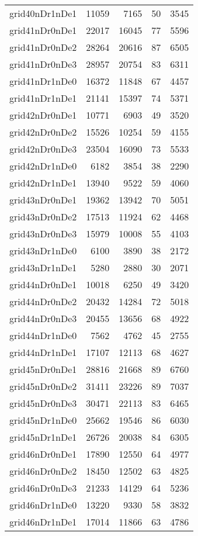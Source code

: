 \begin{tabular}{lrrrr}
grid40nDr1nDe1 & 11059 & 7165 & 50 & 3545 \\
grid41nDr0nDe1 & 22017 & 16045 & 77 & 5596 \\
grid41nDr0nDe2 & 28264 & 20616 & 87 & 6505 \\
grid41nDr0nDe3 & 28957 & 20754 & 83 & 6311 \\
grid41nDr1nDe0 & 16372 & 11848 & 67 & 4457 \\
grid41nDr1nDe1 & 21141 & 15397 & 74 & 5371 \\
grid42nDr0nDe1 & 10771 & 6903 & 49 & 3520 \\
grid42nDr0nDe2 & 15526 & 10254 & 59 & 4155 \\
grid42nDr0nDe3 & 23504 & 16090 & 73 & 5533 \\
grid42nDr1nDe0 & 6182 & 3854 & 38 & 2290 \\
grid42nDr1nDe1 & 13940 & 9522 & 59 & 4060 \\
grid43nDr0nDe1 & 19362 & 13942 & 70 & 5051 \\
grid43nDr0nDe2 & 17513 & 11924 & 62 & 4468 \\
grid43nDr0nDe3 & 15979 & 10008 & 55 & 4103 \\
grid43nDr1nDe0 & 6100 & 3890 & 38 & 2172 \\
grid43nDr1nDe1 & 5280 & 2880 & 30 & 2071 \\
grid44nDr0nDe1 & 10018 & 6250 & 49 & 3420 \\
grid44nDr0nDe2 & 20432 & 14284 & 72 & 5018 \\
grid44nDr0nDe3 & 20455 & 13656 & 68 & 4922 \\
grid44nDr1nDe0 & 7562 & 4762 & 45 & 2755 \\
grid44nDr1nDe1 & 17107 & 12113 & 68 & 4627 \\
grid45nDr0nDe1 & 28816 & 21668 & 89 & 6760 \\
grid45nDr0nDe2 & 31411 & 23226 & 89 & 7037 \\
grid45nDr0nDe3 & 30471 & 22113 & 83 & 6465 \\
grid45nDr1nDe0 & 25662 & 19546 & 86 & 6030 \\
grid45nDr1nDe1 & 26726 & 20038 & 84 & 6305 \\
grid46nDr0nDe1 & 17890 & 12550 & 64 & 4977 \\
grid46nDr0nDe2 & 18450 & 12502 & 63 & 4825 \\
grid46nDr0nDe3 & 21233 & 14129 & 64 & 5236 \\
grid46nDr1nDe0 & 13220 & 9330 & 58 & 3832 \\
grid46nDr1nDe1 & 17014 & 11866 & 63 & 4786 \\

\end{tabular}
